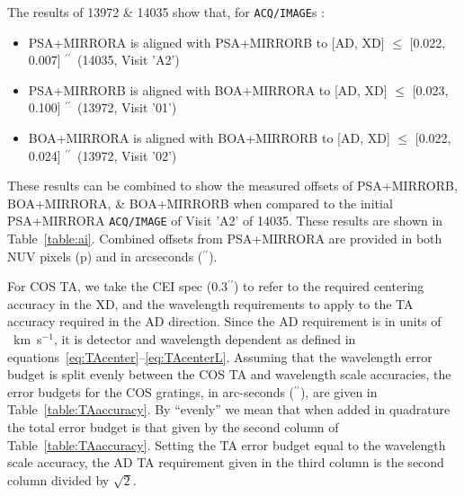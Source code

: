 \documentclass[12pt]{reportj}
\def\arcsec{\hbox{$^{\prime\prime}$}}
\newcommand{\nokmsno}{{\rm km~s}\ensuremath{^{-1}}}
\newcommand{\kmsno}{~\nokmsno}
\newcommand{\kms}{~\nokmsno\ }
\begin{document}
The results of 13972 \& 14035 show that, for \texttt{ACQ/IMAGE}s :
\footnotesize
\begin{itemize}
\item PSA+MIRRORA is aligned with PSA+MIRRORB to [AD, XD] $\le$ [0.022, 0.007] \arcsec\ (14035, Visit 'A2')
\item PSA+MIRRORB is aligned with BOA+MIRRORA to [AD, XD] $\le$ [0.023, 0.100] \arcsec\ (13972, Visit '01')
\item BOA+MIRRORA is aligned with BOA+MIRRORB to [AD, XD] $\le$ [0.022, 0.024] \arcsec\ (13972, Visit '02')
\end{itemize}
\normalsize

These results can be combined to show the measured offsets of PSA+MIRRORB, BOA+MIRRORA, \& BOA+MIRRORB when compared
to the initial PSA+MIRRORA \texttt{ACQ/IMAGE} of Visit 'A2' of 14035. These results are shown in Table~\ref{table:ai}.
Combined offsets from PSA+MIRRORA are provided in both NUV pixels (p) and in arcseconds (\arcsec).

For COS TA, we take the CEI spec (0.3\arcsec) to refer to the required centering accuracy in the XD, and the wavelength requirements to apply to
the TA accuracy required in the AD direction. Since the AD requirement is in units of \kmsno, it is detector and wavelength
dependent as defined in equations~\ref{eq:TAcenter}--\ref{eq:TAcenterL}.
Assuming that the wavelength error budget is split evenly between the COS TA and wavelength scale accuracies,
the error budgets for the COS gratings, in arc-seconds (\arcsec), are given in Table~\ref{table:TAaccuracy}. By ``evenly'' we mean that when added in quadrature the total error budget is that given by the second column of Table~\ref{table:TAaccuracy}.
Setting the TA error budget equal to the wavelength scale accuracy, the AD TA requirement given in the third column is the second column divided by $\sqrt{2}$.
\normalsize
\clearpage
\end{document}
